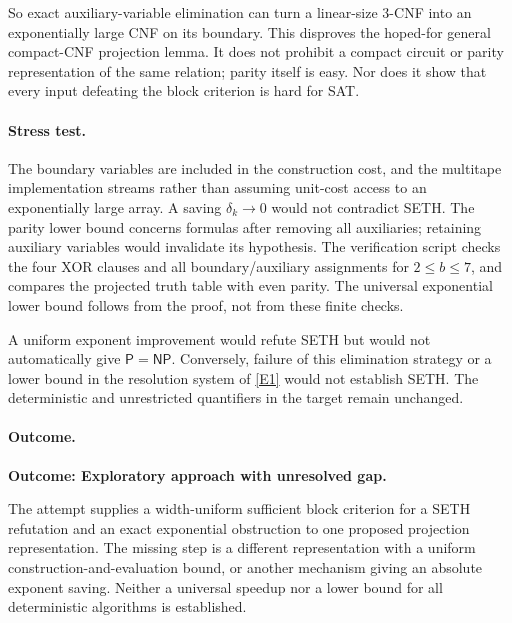 \documentclass[11pt,a4paper]{article}
\newcommand{\eref}[2]{\hyperlink{extra:#1:#2}{[E#2]}}
\numberwithin{equation}{section}
\begin{document}
So exact auxiliary-variable elimination can turn a linear-size 3-CNF into an exponentially large CNF on its boundary. This disproves the hoped-for general compact-CNF projection lemma. It does not prohibit a compact circuit or parity representation of the same relation; parity itself is easy. Nor does it show that every input defeating the block criterion is hard for SAT.

\paragraph{Stress test.}
The boundary variables are included in the construction cost, and the multitape implementation streams rather than assuming unit-cost access to an exponentially large array. A saving $\delta_k\to0$ would not contradict SETH. The parity lower bound concerns formulas after removing all auxiliaries; retaining auxiliary variables would invalidate its hypothesis. The verification script checks the four XOR clauses and all boundary/auxiliary assignments for $2\le b\le7$, and compares the projected truth table with even parity. The universal exponential lower bound follows from the proof, not from these finite checks.

A uniform exponent improvement would refute SETH but would not automatically give $\mathsf P=\mathsf{NP}$. Conversely, failure of this elimination strategy or a lower bound in the resolution system of \eref{statement}{1} would not establish SETH. The deterministic and unrestricted quantifiers in the target remain unchanged.

\paragraph{Outcome.}
\textbf{Outcome: Exploratory approach with unresolved gap.}

The attempt supplies a width-uniform sufficient block criterion for a SETH refutation and an exact exponential obstruction to one proposed projection representation. The missing step is a different representation with a uniform construction-and-evaluation bound, or another mechanism giving an absolute exponent saving. Neither a universal speedup nor a lower bound for all deterministic algorithms is established.

\end{document}
